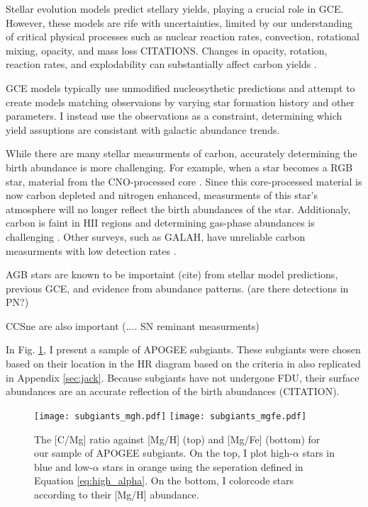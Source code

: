 \documentclass[12pt,oneside]{report}
\begin{document}
Stellar evolution models predict stellary yields, playing a crucial role in GCE.  However, these models are rife with uncertainties, limited by our understanding of critical physical processes such as nuclear reaction rates, convection, rotational mixing, opacity, and mass loss CITATIONS. Changes in opacity, rotation, reaction rates, and explodability can substantially affect carbon yields \citep{KL14,V13, LC18, emily+21}.

GCE models typically use unmodified nucleosythetic predictions and attempt to create models matching observaions by varying star formation history and other parameters. I instead use the observations as a constraint, determining which yield assuptions are consistant with galactic abundance trends. 

While there are many stellar measurments of carbon, accurately determining the birth abundance is more challenging. For example, when a star becomes a RGB star, material from the CNO-processed core \citep{fiorenzo+21,KL14}. Since this core-processed material is now carbon depleted and nitrogen enhanced, measurments of this star's atmosphere will no longer reflect the birth abundances of the star.  Additionaly, carbon is faint in HII regions and determining gas-phase abundances is challenging \citet{skillman+20}.
Other surveys, such as GALAH, have unreliable carbon measurments with low detection rates \citep{emily+19}.

AGB stars are known to be importaint (cite) from stellar model predictions, previous GCE, and evidence from abundance patterns. (are there detections in PN?)

CCSne are also important (.... SN reminant measurments)


In Fig. \ref{fig:subgiants}, I present a sample of APOGEE subgiants. These subgiants were chosen based on their location in the HR diagram based on the criteria in \citet{jack_subgiant} also replicated in Appendix \ref{sec:jack}. Because subgiants have not undergone FDU, their surface abundances are an accurate reflection of the birth abundances (CITATION).  




\begin{figure}[htp]
    \texttt{[image: subgiants\_mgh.pdf]}
    \texttt{[image: subgiants\_mgfe.pdf]}
    \caption[APOGEE Subgiants]{The [C/Mg] ratio against [Mg/H] (top) and [Mg/Fe] (bottom) for our sample of APOGEE subgiants. On the top, I plot high-$\alpha$ stars in blue and low-$\alpha$ stars in orange using the seperation defined in Equation \ref{eq:high_alpha}. On the bottom, I colorcode stars according to their [Mg/H] abundance.}
    \label{fig:subgiants}
\end{figure}
\end{document}
